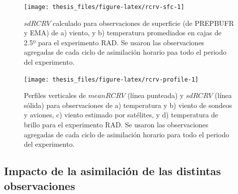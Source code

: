 \documentclass[12pt,oneside]{reedthesis}
\begin{document}
\begin{figure}
\texttt{[image: thesis\_files/figure-latex/rcrv-sfc-1]} \caption{\(sd RCRV\) calculado para observaciones de superficie (de PREPBUFR y EMA) de a) viento, y b) temperatura promediados en cajas de 2.5º para el experimento RAD. Se usaron las observaciones agregadas de cada ciclo de asimilación horario paa todo el periodo del experimento.}\label{fig:rcrv-sfc}
\end{figure}

\begin{figure}
\texttt{[image: thesis\_files/figure-latex/rcrv-profile-1]} \caption{Perfiles verticales de \(mean RCRV\) (línea punteada) y \(sd RCRV\) (línea sólida) para observaciones de a) temperatura y b) viento de sondeos y aviones, c) viento estimado por satélites, y d) temperatura de brillo para el experimento RAD. Se usaron las observaciones agregadas de cada ciclo de asimilación horario para todo el periodo del experimento.}\label{fig:rcrv-profile}
\end{figure}
\hypertarget{impacto-analisis}{%
\subsection{Impacto de la asimilación de las distintas observaciones}\label{impacto-analisis}}
\end{document}
